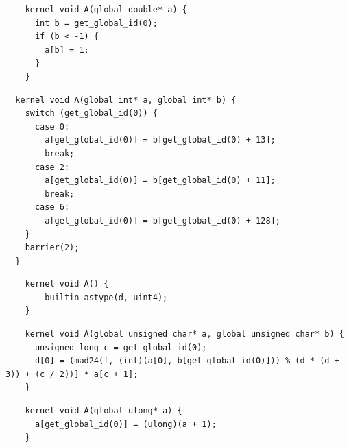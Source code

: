 
\newsavebox{\IntelSizetIntReduced}
\begin{lrbox}{\IntelSizetIntReduced}
  \hspace{1.5em}
  \begin{lstlisting}
    kernel void A(global double* a) {
      int b = get_global_id(0);
      if (b < -1) {
        a[b] = 1;
      }
    }
  \end{lstlisting}
\end{lrbox}

\newsavebox{\OclgrindRaceSwitch}
\begin{lrbox}{\OclgrindRaceSwitch}
  \hspace{1.5em}
  \begin{lstlisting}
  kernel void A(global int* a, global int* b) {
    switch (get_global_id(0)) {
      case 0:
        a[get_global_id(0)] = b[get_global_id(0) + 13];
        break;
      case 2:
        a[get_global_id(0)] = b[get_global_id(0) + 11];
        break;
      case 6:
        a[get_global_id(0)] = b[get_global_id(0) + 128];
    }
    barrier(2);
  }
  \end{lstlisting}
\end{lrbox}

\newsavebox{\AlmostEverythingCrash}
\begin{lrbox}{\AlmostEverythingCrash}
  \hspace{1.5em}
  \begin{lstlisting}
    kernel void A() {
      __builtin_astype(d, uint4);
    }
  \end{lstlisting}
\end{lrbox}

\newsavebox{\OclgrindSemaAssertion}
\begin{lrbox}{\OclgrindSemaAssertion}
  \hspace{1.5em}
  \begin{lstlisting}
    kernel void A(global unsigned char* a, global unsigned char* b) {
      unsigned long c = get_global_id(0);
      d[0] = (mad24(f, (int)(a[0], b[get_global_id(0)])) % (d * (d + 3)) + (c / 2))] * a[c + 1];
    }
  \end{lstlisting}
\end{lrbox}

\newsavebox{\IntelPtrCompilerHang}
\begin{lrbox}{\IntelPtrCompilerHang}
  \hspace{1.5em}
  \begin{lstlisting}
    kernel void A(global ulong* a) {
      a[get_global_id(0)] = (ulong)(a + 1);
    }
  \end{lstlisting}
\end{lrbox}

